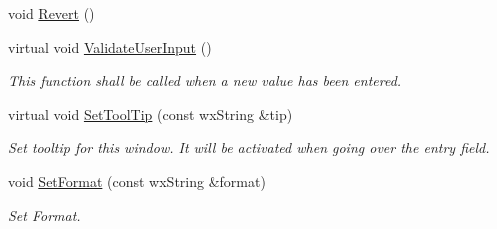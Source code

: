 \begin{DoxyCompactItemize}
void \mbox{\hyperlink{class_obj_cryst_1_1_w_x_field_ref_par_acc2b6724451be954f41a64e09d6cf082}{Revert}} ()
\item 
\mbox{\label{class_obj_cryst_1_1_w_x_field_ref_par_a1f2806f4e1ec82bde3afc3076322ffa4}} 
virtual void \mbox{\hyperlink{class_obj_cryst_1_1_w_x_field_ref_par_a1f2806f4e1ec82bde3afc3076322ffa4}{Validate\+User\+Input}} ()
\begin{DoxyCompactList}\small\item\em This function shall be called when a new value has been entered. \end{DoxyCompactList}\item 
\mbox{\label{class_obj_cryst_1_1_w_x_field_ref_par_af4a432c5446aa26f0f905e301923d9ab}} 
virtual void \mbox{\hyperlink{class_obj_cryst_1_1_w_x_field_ref_par_af4a432c5446aa26f0f905e301923d9ab}{Set\+Tool\+Tip}} (const wx\+String \&tip)
\begin{DoxyCompactList}\small\item\em Set tooltip for this window. It will be activated when going over the entry field. \end{DoxyCompactList}\item 
\mbox{\label{class_obj_cryst_1_1_w_x_field_ref_par_a80558955482a56ecebc56a3285847357}} 
void \mbox{\hyperlink{class_obj_cryst_1_1_w_x_field_ref_par_a80558955482a56ecebc56a3285847357}{Set\+Format}} (const wx\+String \&format)
\begin{DoxyCompactList}\small\item\em Set Format. \end{DoxyCompactList}\end{DoxyCompactItemize}
